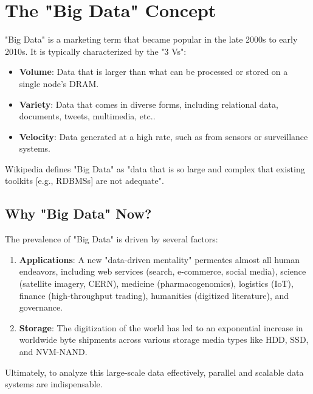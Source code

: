 \documentclass{article}
\begin{document}
\section*{The "Big Data" Concept}
"Big Data" is a marketing term that became popular in the late 2000s to early 2010s. It is typically characterized by the "3 Vs":
\begin{itemize}
    \item \textbf{Volume}: Data that is larger than what can be processed or stored on a single node's DRAM.
    \item \textbf{Variety}: Data that comes in diverse forms, including relational data, documents, tweets, multimedia, etc..
    \item \textbf{Velocity}: Data generated at a high rate, such as from sensors or surveillance systems.
\end{itemize}
Wikipedia defines "Big Data" as "data that is so large and complex that existing toolkits [e.g., RDBMSs] are not adequate".

\subsection*{Why "Big Data" Now?}
The prevalence of "Big Data" is driven by several factors:
\begin{enumerate}
    \item \textbf{Applications}: A new "data-driven mentality" permeates almost all human endeavors, including web services (search, e-commerce, social media), science (satellite imagery, CERN), medicine (pharmacogenomics), logistics (IoT), finance (high-throughput trading), humanities (digitized literature), and governance.
    \item \textbf{Storage}: The digitization of the world has led to an exponential increase in worldwide byte shipments across various storage media types like HDD, SSD, and NVM-NAND.
\end{enumerate}
Ultimately, to analyze this large-scale data effectively, parallel and scalable data systems are indispensable.
\end{document}
